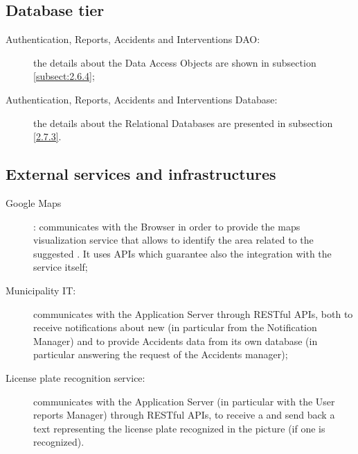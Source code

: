 \documentclass[../../DD.tex]{subfiles}
\begin{document}
\subsection{Database tier\label{sect:2.2.4}}
	\begin{description}
	\item[Authentication, Reports, Accidents and Interventions DAO:] the details about the Data Access Objects are shown in subsection \ref{subsect:2.6.4};
	
	\item[Authentication, Reports, Accidents and Interventions Database:] the details about the Relational Databases are presented in subsection \ref{2.7.3}.
	\end{description}
	
\subsection{External services and infrastructures\label{sect:2.2.5}}
	\begin{description}
	\item[Google Maps]: communicates with the Browser in order to provide the maps visualization service that allows to identify the area related to the suggested . It uses APIs which guarantee also the integration with the service itself;
	
	\item[Municipality IT:] communicates with the Application Server through RESTful APIs, both to receive notifications about new  (in particular from the Notification Manager) and to provide Accidents data from its own database (in particular answering the request of the Accidents manager);
	
	\item[License plate recognition service:] communicates with the Application Server (in particular with the User reports Manager) through RESTful APIs, to receive a  and send back a text representing the license plate recognized in the picture (if one is recognized). 
	\end{description}

\newpage
\end{document}
